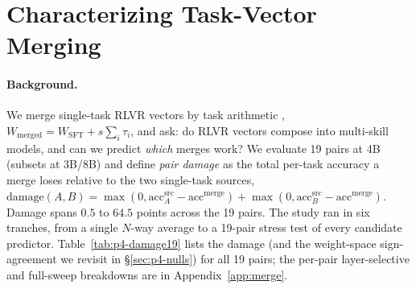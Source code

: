 \documentclass{article}
\newcommand{\tv}{\tau}
\newcommand{\Wsft}{W_{\mathrm{SFT}}}
\begin{document}
\section{Characterizing Task-Vector Merging}
\label{sec:phase4}

\paragraph{Background.} We merge single-task RLVR vectors by task arithmetic
\citep{ilharco2023editing}, $W_{\mathrm{merged}} = \Wsft + s\sum_i \tv_i$, and ask: do RLVR vectors compose into multi-skill
models, and can we predict \emph{which} merges work? We evaluate 19 pairs at 4B (subsets at 3B/8B)
and define \emph{pair damage} as the total per-task accuracy a merge loses relative to the two
single-task sources, $\mathrm{damage}(A,B)=\max(0,\mathrm{acc}_A^{\mathrm{src}}-\mathrm{acc}^{\mathrm{merge}})
+\max(0,\mathrm{acc}_B^{\mathrm{src}}-\mathrm{acc}^{\mathrm{merge}})$. Damage spans $0.5$ to
$64.5$ points across the 19 pairs. The study ran in six tranches, from a single $N$-way average
to a 19-pair stress test of every candidate predictor. Table~\ref{tab:p4-damage19} lists the
damage (and the weight-space sign-agreement we revisit in \S\ref{sec:p4-nulls}) for all 19 pairs;
the per-pair layer-selective and full-sweep breakdowns are in Appendix~\ref{app:merge}.
\end{document}
